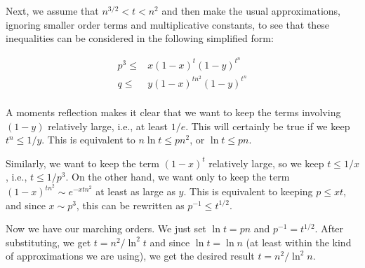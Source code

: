 Next, we assume that $n^{3/2}<t<n^2$ and then make the usual 
approximations, ignoring smaller order terms and multiplicative
constants, to see that these inequalities can be considered in 
the following simplified form:

\begin{align*}
p^3 \le & x(1-x)^{t}(1-y)^{t^n}\\
q \le & y(1-x)^{tn^2}(1-y)^{t^n}\\
\end{align*}

A moments reflection makes it clear that
we want to keep the terms involving
$(1-y)$ relatively large, i.e.,
at least $1/e$.  This will certainly be true if
we keep  $t^n\le 1/y$. This is equivalent
to $n\ln t\le pn^2$, or $\ln t\le pn$.

Similarly, we want to keep the term $(1-x)^{t}$ relatively large,
so we keep $t\le 1/x$, i.e., $t\le 1/p^3$.  On the other hand,
we want only to keep the term $(1-x)^{tn^2}\sim e^{-xtn^2}$ at least as large
as $y$.  This is equivalent to keeping
$p\le xt$, and since $x\sim p^3$, this can be rewritten as $p^{-1}\le t^{1/2}$.  

Now we have our marching orders.  We just set $\ln t=pn$ and
$p^{-1}=t^{1/2}$.  After substituting, we get $t= n^2/\ln^2t$ and
since $\ln t=\ln n$ (at least within the kind of approximations we
are using), we get the desired result $t=n^2/\ln^2n$.



